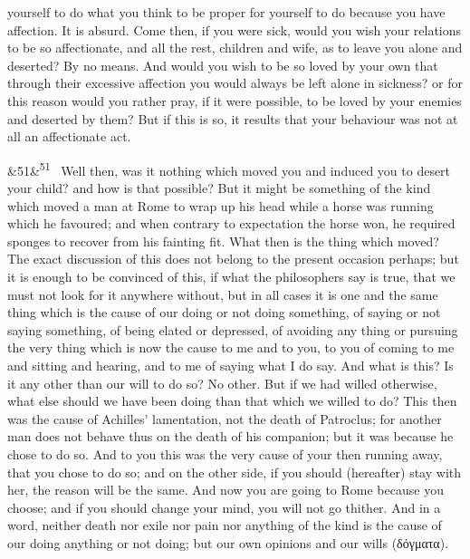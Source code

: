 \documentclass[12pt]{article}
\newcommand{\para}[1][]{\par\noindent\ifx&#1&\else\textsuperscript{\footnotesize #1}~\fi}
\begin{document}
yourself to do what you think to be proper for yourself to do because you have affection. It is absurd. Come then, if you were sick, would you wish your relations to be so affectionate, and all the rest, children and wife, as to leave you alone and deserted? By no means. And would you wish to be so loved by your own that through their excessive affection you would always be left alone in sickness? or for this reason would you rather pray, if it were possible, to be loved by your enemies and deserted by them? But if this is so, it results that your behaviour was not at all an affectionate act.

\para[51] Well then, was it nothing which moved you and induced you to desert your child? and how is that possible? But it might be something of the kind which moved a man at Rome to wrap up his head while a horse was running which he favoured; and when contrary to expectation the horse won, he required sponges to recover from his fainting fit. What then is the thing which moved? The exact discussion of this does not belong to the present occasion perhaps; but it is enough to be convinced of this, if what the philosophers say is true, that we must not look for it anywhere without, but in all cases it is one and the same thing which is the cause of our doing or not doing something, of saying or not saying something, of being elated or depressed, of avoiding any thing or pursuing the very thing which is now the cause to me and to you, to you of coming to me and sitting and hearing, and to me of saying what I do say. And what is this? Is it any other than our will to do so? No other. But if we had willed otherwise, what else should we have been doing than that which we willed to do? This then was the cause of Achilles' lamentation, not the death of Patroclus; for another man does not behave thus on the death of his companion; but it was because he chose to do so. And to you this was the very cause of your then running away, that you chose to do so; and on the other side, if you should (hereafter) stay with her, the reason will be the same. And now you are going to Rome because you choose; and if you should change your mind, you will not go thither. And in a word, neither death nor exile nor pain nor anything of the kind is the cause of our doing anything or not doing; but our own opinions and our wills (δόγματα).
\end{document}
